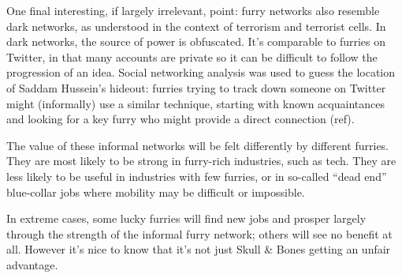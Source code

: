 One final interesting, if largely irrelevant, point: furry networks also resemble dark networks, as understood in the context of terrorism and terrorist cells. In dark networks, the source of power is obfuscated. It's comparable to furries on Twitter, in that many accounts are private so it can be difficult to follow the progression of an idea. Social networking analysis was used to guess the location of Saddam Hussein's hideout: furries trying to track down someone on Twitter might (informally) use a similar technique, starting with known acquaintances and looking for a key furry who might provide a direct connection (ref).

The value of these informal networks will be felt differently by different furries. They are most likely to be strong in furry-rich industries, such as tech. They are less likely to be useful in industries with few furries, or in so-called ``dead end'' blue-collar jobs where mobility may be difficult or impossible.

In extreme cases, some lucky furries will find new jobs and prosper largely through the strength of the informal furry network; others will see no benefit at all. However it's nice to know that it's not just Skull \& Bones getting an unfair advantage.

